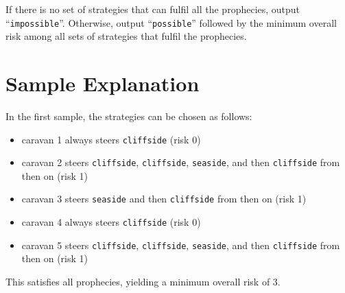 \begin{Output}
If there is no set of strategies that can fulfil all the prophecies, output ``\texttt{impossible}''. Otherwise, output ``\texttt{possible}'' followed by the minimum overall risk among all sets of strategies that fulfil the prophecies.
\end{Output}

\section*{Sample Explanation}

In the first sample, the strategies can be chosen as follows:
\begin{itemize}
	\item caravan 1 always steers \texttt{cliffside} (risk 0)
	\item caravan 2 steers \texttt{cliffside}, \texttt{cliffside}, \texttt{seaside}, and then \texttt{cliffside} from then on (risk 1)
	\item caravan 3 steers \texttt{seaside} and then \texttt{cliffside} from then on (risk 1)
	\item caravan 4 always steers \texttt{cliffside} (risk 0)
	\item caravan 5 steers \texttt{cliffside}, \texttt{cliffside}, \texttt{seaside}, and then \texttt{cliffside} from then on (risk 1)
\end{itemize}
This satisfies all prophecies, yielding a minimum overall risk of 3.
